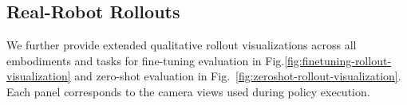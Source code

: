 \subsection{Real-Robot Rollouts}
We further provide extended qualitative rollout visualizations across all embodiments and tasks for fine-tuning evaluation in Fig.\ref{fig:finetuning-rollout-visualization} and zero-shot evaluation in Fig.~\ref{fig:zeroshot-rollout-visualization}. 
Each panel corresponds to the camera views used during policy execution. 


